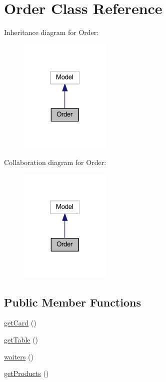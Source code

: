 \hypertarget{class_app_1_1_models_1_1_order}{}\section{Order Class Reference}
\label{class_app_1_1_models_1_1_order}


Inheritance diagram for Order\+:
\nopagebreak
\begin{figure}[H]
\begin{center}
\leavevmode
\includegraphics[width=123pt]{class_app_1_1_models_1_1_order__inherit__graph}
\end{center}
\end{figure}


Collaboration diagram for Order\+:
\nopagebreak
\begin{figure}[H]
\begin{center}
\leavevmode
\includegraphics[width=123pt]{class_app_1_1_models_1_1_order__coll__graph}
\end{center}
\end{figure}
\subsection*{Public Member Functions}
\begin{DoxyCompactItemize}
\item 
\mbox{\hyperlink{class_app_1_1_models_1_1_order_af3296e61356149835fcdba50e4075f56}{get\+Card}} ()
\item 
\mbox{\hyperlink{class_app_1_1_models_1_1_order_aa0dd4bf57d57bc2a3697e40c9f6bddce}{get\+Table}} ()
\item 
\mbox{\hyperlink{class_app_1_1_models_1_1_order_aa314a2ddd62ccb42f5a3f80ee8c316e1}{waiters}} ()
\item 
\mbox{\hyperlink{class_app_1_1_models_1_1_order_a9686a480a1adb1923d64e71cf0624275}{get\+Products}} ()
\end{DoxyCompactItemize}
